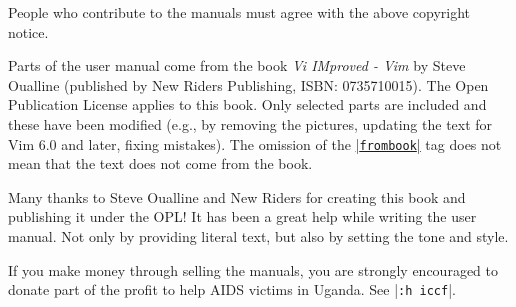 People who contribute to the manuals must agree with the above copyright notice.

\label{frombook}
Parts of the user manual come from the book \textit{Vi IMproved - Vim} by Steve Oualline (published by New Riders Publishing, ISBN: 0735710015).
The Open Publication License applies to this book.
Only selected parts are included and these have been modified (e.g., by removing the pictures, updating the text for Vim 6.0 and later, fixing mistakes).
The omission of the \hyperref[frombook]{|\texttt{frombook}|} tag does not mean that the text does not come from the book.

Many thanks to Steve Oualline and New Riders for creating this book and publishing it under the OPL!
It has been a great help while writing the user manual.
Not only by providing literal text, but also by setting the tone and style.

If you make money through selling the manuals, you are strongly encouraged to donate part of the profit to help AIDS victims in Uganda.
See |\texttt{:h iccf}|.
\clearpage

